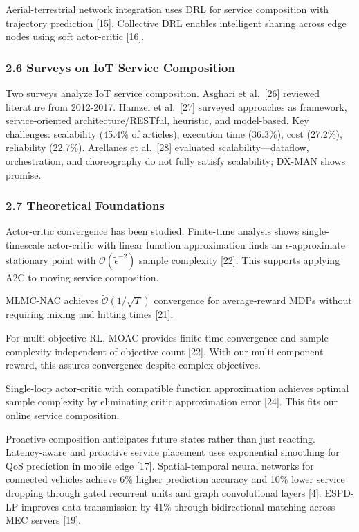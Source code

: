 Aerial-terrestrial network integration uses DRL for service composition
with trajectory prediction {[}15{]}. Collective DRL enables intelligent
sharing across edge nodes using soft actor-critic {[}16{]}.

\hypertarget{surveys-on-iot-service-composition}{%
	\subsubsection{2.6 Surveys on IoT Service
		Composition}\label{surveys-on-iot-service-composition}}

Two surveys analyze IoT service composition. Asghari et al.~{[}26{]}
reviewed literature from 2012-2017. Hamzei et al.~{[}27{]} surveyed
approaches as framework, service-oriented architecture/RESTful,
heuristic, and model-based. Key challenges: scalability (45.4\% of
articles), execution time (36.3\%), cost (27.2\%), reliability (22.7\%).
Arellanes et al.~{[}28{]} evaluated scalability---dataflow,
orchestration, and choreography do not fully satisfy scalability; DX-MAN
shows promise.

\hypertarget{theoretical-foundations}{%
	\subsubsection{2.7 Theoretical
		Foundations}\label{theoretical-foundations}}

Actor-critic convergence has been studied. Finite-time analysis shows
single-timescale actor-critic with linear function approximation finds
an \(\epsilon\)-approximate stationary point with
\(\mathcal{O}(\tilde{\epsilon}^{-2})\) sample complexity {[}22{]}. This
supports applying A2C to moving service composition.

MLMC-NAC achieves \(\tilde{\mathcal{O}}(1/\sqrt{T})\) convergence for
average-reward MDPs without requiring mixing and hitting times {[}21{]}.

For multi-objective RL, MOAC provides finite-time convergence and sample
complexity independent of objective count {[}22{]}. With our
multi-component reward, this assures convergence despite complex
objectives.

Single-loop actor-critic with compatible function approximation achieves
optimal sample complexity by eliminating critic approximation error
{[}24{]}. This fits our online service composition.

Proactive composition anticipates future states rather than just
reacting. Latency-aware and proactive service placement uses exponential
smoothing for QoS prediction in mobile edge {[}17{]}. Spatial-temporal
neural networks for connected vehicles achieve 6\% higher prediction
accuracy and 10\% lower service dropping through gated recurrent units
and graph convolutional layers {[}4{]}. ESPD-LP improves data
transmission by 41\% through bidirectional matching across MEC servers
{[}19{]}.

